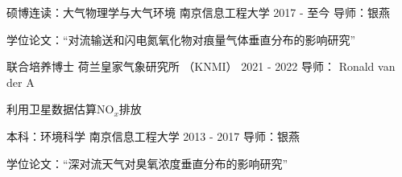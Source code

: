 

\begin{cventries}

  \cventry
    {硕博连读：大气物理学与大气环境} %
    {南京信息工程大学} %
    {2017 - 至今} %
    {导师：银燕} %
    {
      \begin{cvitems} %
        \item {学位论文：“对流输送和闪电氮氧化物对痕量气体垂直分布的影响研究”}
      \end{cvitems}
    }

  \cventry
    {联合培养博士} %
    {荷兰皇家气象研究所 （KNMI）} %
    {2021 - 2022} %
    {导师： Ronald van der A} %
    {
      \begin{cvitems} %
        \item {利用卫星数据估算NO$_x$排放}
      \end{cvitems}
    }

  \cventry
    {本科：环境科学} %
    {南京信息工程大学} %
    {2013 - 2017} %
    {导师：银燕} %
    {
      \begin{cvitems} %
        \item {学位论文：“深对流天气对臭氧浓度垂直分布的影响研究”}
      \end{cvitems}
    }


\end{cventries}
